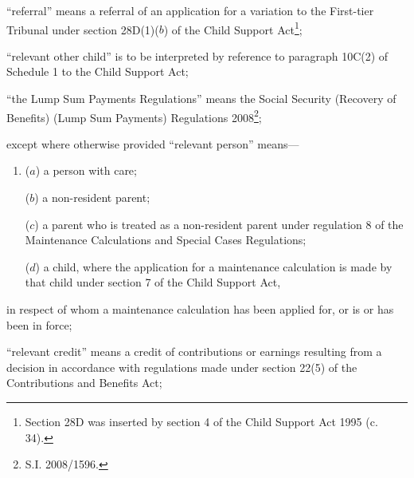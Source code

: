 \documentclass[12pt,a4paper]{article}
\begin{document}
\begin{enumerate}

“referral” means a referral of an application for a 
variation  %
to 
the First-tier Tribunal  %
under section 28D(1)($b$) of the Child Support Act\footnote{\frenchspacing Section 28D was inserted by section 4 of the Child Support Act 1995 (c. 34).};

\begin{sloppypar}
“relevant other child” is to be interpreted by reference to paragraph 10C(2) of Schedule 1 to the Child Support Act;
\end{sloppypar}

“the Lump Sum Payments Regulations” means the Social Security (Recovery of Benefits) (Lump Sum Payments) Regulations 2008\footnote{S.I. 2008/1596.};

except where otherwise provided “relevant person” means—
\begin{enumerate}\item[]
    ($a$) 
    a person with care;

    ($b$) 
    a non-resident parent;

    ($c$) 
    a parent who is treated as a non-resident parent under regulation 8 of the Maintenance Calculations and Special Cases Regulations;

    ($d$) 
    a child, where the application for a maintenance calculation is made by that child under section 7 of the Child Support Act,
\end{enumerate}
    in respect of whom a maintenance calculation has been applied for, 
or is or has been in force;

“relevant credit” means a credit of contributions or earnings resulting from a decision in accordance with regulations made under section 22(5) of the Contributions and Benefits Act;


\end{enumerate}
\end{document}
